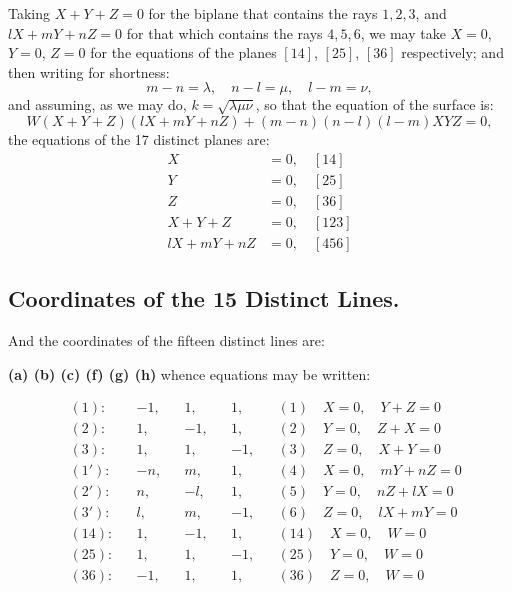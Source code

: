 \documentclass[11pt,a4paper]{article}
\begin{document}
Taking $X + Y + Z = 0$ for the biplane that contains the rays $1, 2, 3$, and $lX + mY + nZ = 0$ for that which contains the rays $4, 5, 6$, we may take $X = 0$, $Y = 0$, $Z = 0$ for the equations of the planes $[14]$, $[25]$, $[36]$ respectively; and then writing for shortness:
\begin{equation*}
m - n = \lambda, \quad n - l = \mu, \quad l - m = \nu,
\end{equation*}
and assuming, as we may do, $k = \sqrt{\lambda\mu\nu}$, so that the equation of the surface is:
\begin{equation*}
W(X+Y+Z)(lX+mY+nZ) + (m-n)(n-l)(l-m)XYZ = 0,
\end{equation*}
the equations of the 17 distinct planes are:
\begin{align*}
X &= 0, \quad [14] \\
Y &= 0, \quad [25] \\
Z &= 0, \quad [36] \\
X + Y + Z &= 0, \quad [123] \\
lX + mY + nZ &= 0, \quad [456]
\end{align*}

\subsection*{Coordinates of the 15 Distinct Lines.}

And the coordinates of the fifteen distinct lines are:

\begin{center}
\textbf{(a) (b) (c) (f) (g) (h)} whence equations may be written:
\end{center}
\begin{align*}
&(1): && -1, && 1, && 1, && (1) \quad X = 0, \quad Y + Z = 0 \\
&(2): && 1, && -1, && 1, && (2) \quad Y = 0, \quad Z + X = 0 \\
&(3): && 1, && 1, && -1, && (3) \quad Z = 0, \quad X + Y = 0 \\
&(1'): && -n, && m, && 1, && (4) \quad X = 0, \quad mY + nZ = 0 \\
&(2'): && n, && -l, && 1, && (5) \quad Y = 0, \quad nZ + lX = 0 \\
&(3'): && l, && m, && -1, && (6) \quad Z = 0, \quad lX + mY = 0 \\
&(14): && 1, && -1, && 1, && (14) \quad X = 0, \quad W = 0 \\
&(25): && 1, && 1, && -1, && (25) \quad Y = 0, \quad W = 0 \\
&(36): && -1, && 1, && 1, && (36) \quad Z = 0, \quad W = 0
\end{align*}
\end{document}
